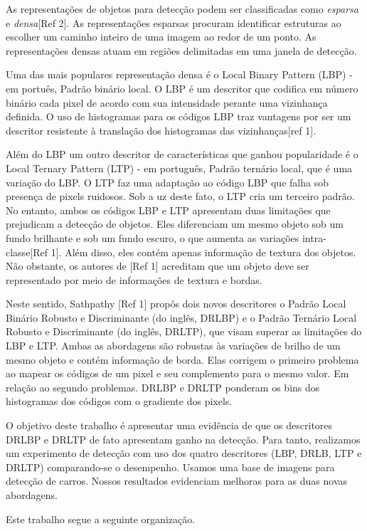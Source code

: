 \documentclass[a4paper,twocolumn]{article}
\begin{document}
As representações de objetos para detecção podem ser classificadas como \textit{esparsa} e \textit{densa}[Ref 2]. As representações esparsas procuram identificar estruturas ao escolher um caminho inteiro de uma imagem ao redor de um ponto. As representações densas atuam em regiões delimitadas em uma janela de detecção.

Uma das mais populares representação densa é o Local Binary Pattern (LBP) - em portuês, Padrão binário local. O LBP é um descritor que codifica em número binário cada pixel de acordo com sua intensidade perante uma vizinhança definida. O uso de histogramas para os códigos LBP traz vantagens por ser um descritor resistente à translação dos histogramas das vizinhanças[ref 1]. 

Além do LBP um outro descritor de características que ganhou popularidade é o Local Ternary Pattern (LTP) - em português, Padrão ternário local, que é uma variação do LBP. O LTP faz uma adaptação ao código LBP que falha sob presença de pixels ruidosos. Sob a uz deste fato, o LTP cria um terceiro padrão. No entanto, ambos os códigos LBP e LTP apresentam duas limitações que prejudicam a detecção de objetos. Eles diferenciam um mesmo objeto sob um fundo brilhante e sob um fundo escuro, o que aumenta as variações intra-classe[Ref 1]. Além disso, eles contém apenas informação de textura dos objetos. Não obstante, os autores de [Ref 1] acreditam que um objeto deve ser representado por meio de informações de textura e bordas. 

Neste sentido, Sathpathy [Ref 1] propôs dois novos descritores o Padrão Local Binário Robusto e Discriminante (do inglês, DRLBP) e o Padrão Ternário Local Robusto e Discriminante (do inglês, DRLTP), que visam superar as limitações do LBP e LTP. Ambas as abordagens são robustas às variações de brilho de um mesmo objeto e contém informação de borda. Elas corrigem o primeiro  problema ao mapear os códigos de um pixel e seu complemento para o mesmo valor. Em relação ao segundo problemas. DRLBP e DRLTP ponderam os bins dos histogramas dos códigos com o gradiente dos pixels.

O objetivo deste trabalho é apresentar uma evidência de que os descritores DRLBP e DRLTP  de fato apresentam ganho na detecção. Para tanto, realizamos um experimento de detecção com uso dos quatro descritores (LBP, DRLB, LTP e DRLTP) comparando-se o desempenho. Usamos uma base de imagens para detecção de carros. Nossos resultados evidenciam melhoras para as duas novas abordagens.

Este trabalho segue a seguinte organização. %
\end{document}
